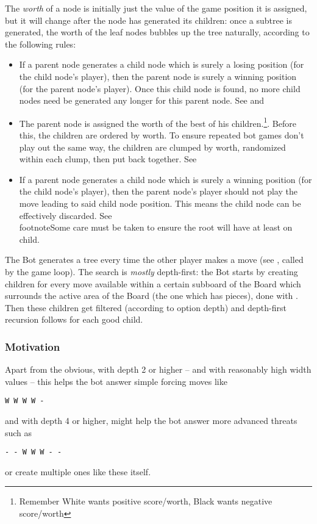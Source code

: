 \documentclass[12pt,a4paper,notitlepage]{article}
\begin{document}
The \textit{worth} of a node is initially just the value of the game position it is assigned, but it will change after the node has generated its children: once a subtree is generated, the worth of the leaf nodes bubbles up the tree naturally, according to the following rules:
\begin{itemize}
\item If a parent node generates a child node which is surely a losing position (for the child node's player), then the parent node is surely a winning position (for the parent node's player). Once this child node is found, no more child nodes need be generated any longer for this parent node. See  and 
\item The parent node is assigned the worth of the best of his children.\footnote{Remember White wants positive score/worth, Black wants negative score/worth}. Before this, the children are ordered by worth. To ensure repeated bot games don't play out the same way, the children are clumped by worth, randomized within each clump, then put back together. See 
\item If a parent node generates a child node which is surely a winning position (for the child node's player), then the parent node's player should not play the move leading to said child node position. This means the child node can be effectively discarded. See  \\footnote{Some care must be taken to ensure the root will have at least on child.}
\end{itemize}

The Bot generates a tree every time the other player makes a move (see , called by the game loop).
The search is \textit{mostly} depth-first: the Bot starts by creating children for every move available within a certain subboard of the Board which surrounds the active area of the Board (the one which has pieces),
done with . Then these children get filtered (according to option depth) and depth-first recursion follows for each good child.

\subsubsection{Motivation}
\label{subsubsec:motivationbot}

Apart from the obvious, with depth 2 or higher -- and with reasonably high width values -- this helps the bot answer simple forcing moves like
\begin{center}
\tt W W W W -
\end{center}
and with depth 4 or higher, might help the bot answer more advanced threats such as
\begin{center}
\tt - - W W W - -
\end{center}
or create multiple ones like these itself.
\end{document}
